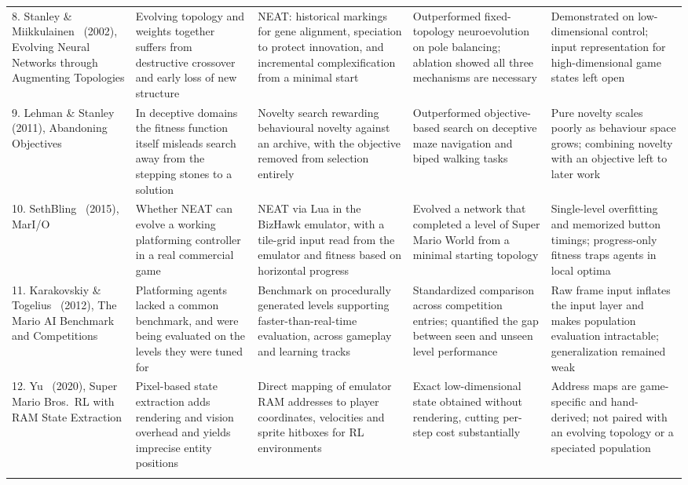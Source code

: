 \begin{longtable}{@{}R{0.175\textwidth} R{0.185\textwidth} R{0.185\textwidth} R{0.185\textwidth} R{0.185\textwidth}@{}}
8. Stanley \& Miikkulainen~\cite{stanley2002} (2002), Evolving Neural Networks through Augmenting
Topologies &
Evolving topology and weights together suffers from destructive crossover and
early loss of new structure &
NEAT: historical markings for gene alignment, speciation to protect innovation,
and incremental complexification from a minimal start &
Outperformed fixed-topology neuroevolution on pole balancing; ablation showed
all three mechanisms are necessary &
Demonstrated on low-dimensional control; input representation for
high-dimensional game states left open \\
\addlinespace

9. Lehman \& Stanley~\cite{lehman2011} (2011), Abandoning Objectives &
In deceptive domains the fitness function itself misleads search away from the
stepping stones to a solution &
Novelty search rewarding behavioural novelty against an archive, with the
objective removed from selection entirely &
Outperformed objective-based search on deceptive maze navigation and biped
walking tasks &
Pure novelty scales poorly as behaviour space grows; combining novelty with an
objective left to later work \\
\addlinespace

10. SethBling~\cite{sethbling2015} (2015), MarI/O &
Whether NEAT can evolve a working platforming controller in a real commercial
game &
NEAT via Lua in the BizHawk emulator, with a tile-grid input read from the
emulator and fitness based on horizontal progress &
Evolved a network that completed a level of Super Mario World from a minimal
starting topology &
Single-level overfitting and memorized button timings; progress-only fitness
traps agents in local optima \\
\addlinespace

11. Karakovskiy \& Togelius~\cite{karakovskiy2012} (2012), The Mario AI Benchmark and Competitions &
Platforming agents lacked a common benchmark, and were being evaluated on the
levels they were tuned for &
Benchmark on procedurally generated levels supporting faster-than-real-time
evaluation, across gameplay and learning tracks &
Standardized comparison across competition entries; quantified the gap between
seen and unseen level performance &
Raw frame input inflates the input layer and makes population evaluation
intractable; generalization remained weak \\
\addlinespace

12. Yu~\cite{yu2020} (2020), Super Mario Bros.\ RL with RAM State Extraction &
Pixel-based state extraction adds rendering and vision overhead and yields
imprecise entity positions &
Direct mapping of emulator RAM addresses to player coordinates, velocities and
sprite hitboxes for RL environments &
Exact low-dimensional state obtained without rendering, cutting per-step cost
substantially &
Address maps are game-specific and hand-derived; not paired with an evolving
topology or a speciated population \\
\addlinespace


\end{longtable}
